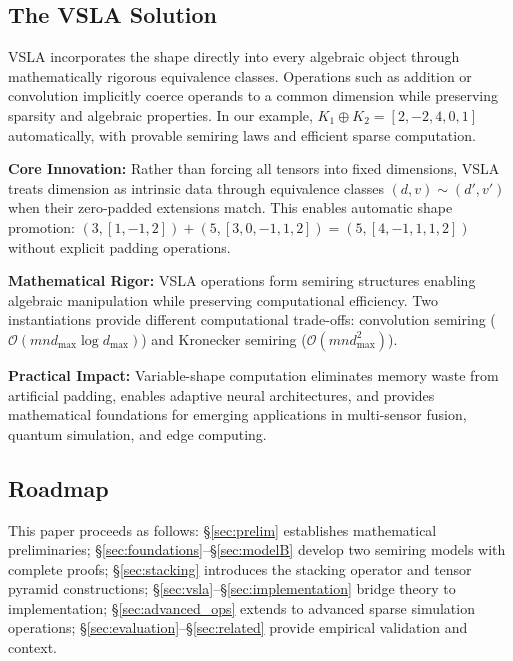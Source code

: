 \subsection{The VSLA Solution}
VSLA incorporates the shape directly into every algebraic object through mathematically rigorous equivalence classes.  Operations such as addition or convolution implicitly coerce operands to a common dimension while preserving sparsity and algebraic properties. In our example, $K_1 \oplus K_2 = [2, -2, 4, 0, 1]$ automatically, with provable semiring laws and efficient sparse computation.

\textbf{Core Innovation:} Rather than forcing all tensors into fixed dimensions, VSLA treats dimension as intrinsic data through equivalence classes $(d,v) \sim (d',v')$ when their zero-padded extensions match. This enables automatic shape promotion: $(3,[1,-1,2]) + (5,[3,0,-1,1,2]) = (5,[4,-1,1,1,2])$ without explicit padding operations.

\textbf{Mathematical Rigor:} VSLA operations form semiring structures enabling algebraic manipulation while preserving computational efficiency. Two instantiations provide different computational trade-offs: convolution semiring ($\mbox{$\mathcal{O}(mn d_{\max} \log d_{\max})$}$) and Kronecker semiring ($\mbox{$\mathcal{O}(mn d_{\max}^2)$}$).

\textbf{Practical Impact:} Variable-shape computation eliminates memory waste from artificial padding, enables adaptive neural architectures, and provides mathematical foundations for emerging applications in multi-sensor fusion, quantum simulation, and edge computing.

\subsection{Roadmap}
This paper proceeds as follows: \S\ref{sec:prelim} establishes mathematical preliminaries; \S\ref{sec:foundations}–\S\ref{sec:modelB} develop two semiring models with complete proofs; \S\ref{sec:stacking} introduces the stacking operator and tensor pyramid constructions; \S\ref{sec:vsla}–\S\ref{sec:implementation} bridge theory to implementation; \S\ref{sec:advanced_ops} extends to advanced sparse simulation operations; \S\ref{sec:evaluation}–\S\ref{sec:related} provide empirical validation and context.
